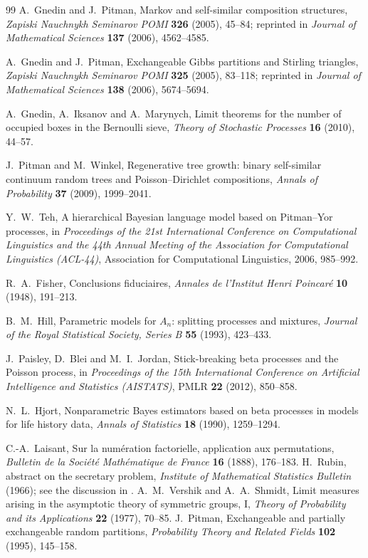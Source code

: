\documentclass[11pt]{article}
\theoremstyle{plain}
\theoremstyle{definition}
\begin{document}
\begin{thebibliography}{99}
 A.~Gnedin and J.~Pitman, Markov and self-similar composition structures, \emph{Zapiski Nauchnykh Seminarov POMI} \textbf{326} (2005), 45--84; reprinted in \emph{Journal of Mathematical Sciences} \textbf{137} (2006), 4562--4585.

 A.~Gnedin and J.~Pitman, Exchangeable Gibbs partitions and Stirling triangles, \emph{Zapiski Nauchnykh Seminarov POMI} \textbf{325} (2005), 83--118; reprinted in \emph{Journal of Mathematical Sciences} \textbf{138} (2006), 5674--5694.

 A.~Gnedin, A.~Iksanov and A.~Marynych, Limit theorems for the number of occupied boxes in the Bernoulli sieve, \emph{Theory of Stochastic Processes} \textbf{16} (2010), 44--57.

 J.~Pitman and M.~Winkel, Regenerative tree growth: binary self-similar continuum random trees and Poisson--Dirichlet compositions, \emph{Annals of Probability} \textbf{37} (2009), 1999--2041.

 Y.~W.~Teh, A hierarchical Bayesian language model based on Pitman--Yor processes, in \emph{Proceedings of the 21st International Conference on Computational Linguistics and the 44th Annual Meeting of the Association for Computational Linguistics (ACL-44)}, Association for Computational Linguistics, 2006, 985--992.

 R.~A.~Fisher, Conclusions fiduciaires, \emph{Annales de l'Institut Henri Poincar\'e} \textbf{10} (1948), 191--213.

 B.~M.~Hill, Parametric models for \(A_n\): splitting processes and mixtures, \emph{Journal of the Royal Statistical Society, Series B} \textbf{55} (1993), 423--433.

 J.~Paisley, D.~Blei and M.~I.~Jordan, Stick-breaking beta processes and the Poisson process, in \emph{Proceedings of the 15th International Conference on Artificial Intelligence and Statistics (AISTATS)}, PMLR \textbf{22} (2012), 850--858.

 N.~L.~Hjort, Nonparametric Bayes estimators based on beta processes in models for life history data, \emph{Annals of Statistics} \textbf{18} (1990), 1259--1294.


 C.-A.~Laisant, Sur la num\'eration factorielle, application aux permutations, \emph{Bulletin de la Soci\'et\'e Math\'ematique de France} \textbf{16} (1888), 176--183.
 H.~Rubin, abstract on the secretary problem, \emph{Institute of Mathematical Statistics Bulletin} (1966); see the discussion in \cite{Pitman2006}.
 A.~M.~Vershik and A.~A.~Shmidt, Limit measures arising in the asymptotic theory of symmetric groups, I, \emph{Theory of Probability and its Applications} \textbf{22} (1977), 70--85.
 J.~Pitman, Exchangeable and partially exchangeable random partitions, \emph{Probability Theory and Related Fields} \textbf{102} (1995), 145--158.



\end{thebibliography}
\end{document}
